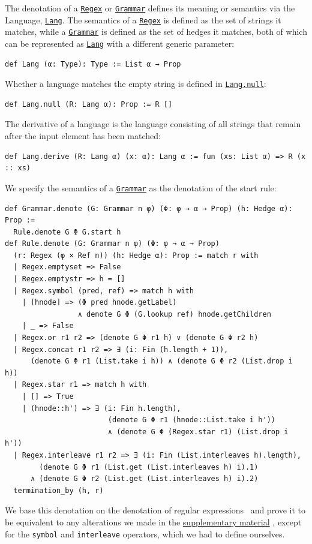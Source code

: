 \documentclass[acmsmall,%
  screen,%
  authorversion, %
  nonacm%
]{acmart}
\newcommand{\link}[2]{\mbox{\hyperref[#2]{\lstinline{#1}}}\xspace}
\newcommand{\Grammar}{\link{Grammar}{Grammar}}
\newcommand{\Regex}{\link{Regex}{Regex}}
\newcommand{\Lang}{\link{Lang}{def Lang}}
\newcommand{\LangNull}{\link{Lang.null}{def Lang.null}}
\newcommand{\supplementarymaterial}{%
  \hyperref[supplementary_material]{supplementary material}\xspace%
}
\begin{document}
The denotation of a \Regex or \Grammar defines its meaning or semantics via the Language, \Lang.
The semantics of a \Regex is defined as the set of strings it matches, while a \Grammar is defined as the set of hedges it matches, both of which can be represented as \Lang with a different generic parameter:
\begin{lstlisting}[label=def Lang]
def Lang (α: Type): Type := List α → Prop
\end{lstlisting}
Whether a language matches the empty string is defined in \LangNull:
\begin{lstlisting}[label=def Lang.null]
def Lang.null (R: Lang α): Prop := R []
\end{lstlisting}
The derivative of a language is the language consisting of all strings that remain after the input element has been matched:
\begin{lstlisting}[label=def Lang.derive]
def Lang.derive (R: Lang α) (x: α): Lang α := fun (xs: List α) => R (x :: xs)
\end{lstlisting}
We specify the semantics of a \Grammar as the denotation of the start rule:
\begin{lstlisting}[label=def Rule.denote]
def Grammar.denote (G: Grammar n φ) (Φ: φ → α → Prop) (h: Hedge α): Prop :=
  Rule.denote G Φ G.start h
def Rule.denote (G: Grammar n φ) (Φ: φ → α → Prop)
  (r: Regex (φ × Ref n)) (h: Hedge α): Prop := match r with
  | Regex.emptyset => False
  | Regex.emptystr => h = []
  | Regex.symbol (pred, ref) => match h with
    | [hnode] => (Φ pred hnode.getLabel)
                 ∧ denote G Φ (G.lookup ref) hnode.getChildren
    | _ => False
  | Regex.or r1 r2 => (denote G Φ r1 h) ∨ (denote G Φ r2 h)
  | Regex.concat r1 r2 => ∃ (i: Fin (h.length + 1)),
      (denote G Φ r1 (List.take i h)) ∧ (denote G Φ r2 (List.drop i h))
  | Regex.star r1 => match h with
    | [] => True
    | (hnode::h') => ∃ (i: Fin h.length),
                        (denote G Φ r1 (hnode::List.take i h'))
                        ∧ (denote G Φ (Regex.star r1) (List.drop i h'))
  | Regex.interleave r1 r2 => ∃ (i: Fin (List.interleaves h).length),
        (denote G Φ r1 (List.get (List.interleaves h) i).1)
      ∧ (denote G Φ r2 (List.get (List.interleaves h) i).2)
  termination_by (h, r)
\end{lstlisting}
We base this denotation on the denotation of regular expressions~\cite{elliott2021symbolic} and prove it to be equivalent to any alterations we made in the \supplementarymaterial, except for the \lstinline{symbol} and \lstinline{interleave} operators, which we had to define ourselves.
\end{document}
